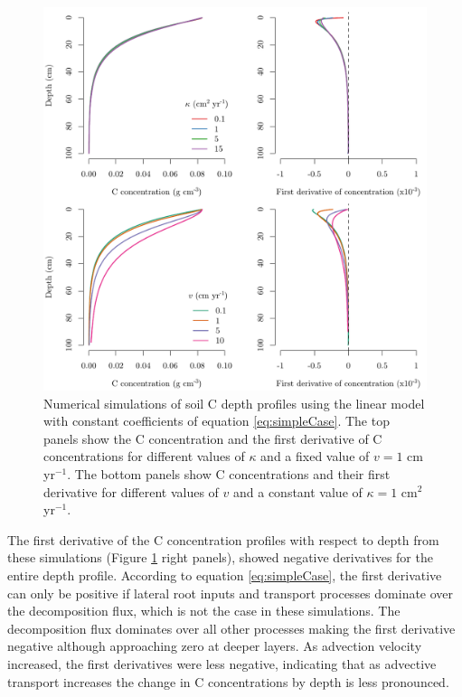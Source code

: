 \documentclass[11pt, oneside, a4paper]{article}   	%
\begin{document}
\begin{figure}[htbp]
   \centering
   \includegraphics[width=\textwidth]{Figures/simulationsKappaV.pdf} %
   \caption{Numerical simulations of soil C depth profiles using the linear model with constant coefficients of equation \ref{eq:simpleCase}. The top panels show the C concentration and the first derivative of C concentrations for different values of $\kappa$ and a fixed value of $v = 1$ cm yr$^{-1}$. The bottom panels show C concentrations and their first derivative for different values of $v$ and a constant value of $\kappa = 1$ cm$^2$ yr$^{-1}$. }
   \label{fig:AdvectionDiffusion}
\end{figure}

The first derivative of the C concentration profiles with respect to depth from these simulations (Figure \ref{fig:AdvectionDiffusion} right panels), showed negative derivatives for the entire depth profile. According to equation \ref{eq:simpleCase}, the first derivative can only be positive if lateral root inputs and transport processes dominate over the decomposition flux, which is not the case in these simulations. The decomposition flux dominates over all other processes making the first derivative negative although approaching zero at deeper layers. As advection velocity increased, the first derivatives were less negative, indicating that as advective transport increases the change in C concentrations by depth is less pronounced.
\end{document}
